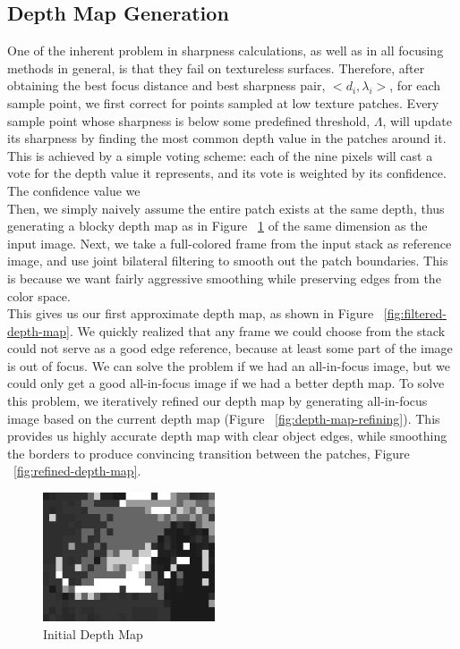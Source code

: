 \documentclass[annual, 12pt]{acmsiggraph}
\begin{document}
\subsection{Depth Map Generation}
\label{sec:depthmap-generation}
One of the inherent problem in sharpness calculations, as well as in all focusing methods in general, is that they fail on textureless surfaces.  Therefore, after obtaining the best focus distance and best sharpness pair, $<d_i, \lambda_i>$, for each sample point, we first correct for points sampled at low texture patches.  Every sample point whose sharpness is below some predefined threshold, $\Lambda$, will update its sharpness by finding the most common depth value in the patches around it.  This is achieved by a simple voting scheme: each of the nine pixels will cast a vote for the depth value it represents, and its vote is weighted by its confidence.  The confidence value we \\

Then, we simply naively assume the entire patch exists at the same depth, thus generating a blocky depth map as in Figure ~\ref{fig:initial-depth-map} of the same dimension as the input image. Next, we take a full-colored frame from the input stack as reference image, and use joint bilateral filtering to smooth out the patch boundaries.  This is because we want fairly aggressive smoothing while preserving edges from the color space. \\
This gives us our first approximate depth map, as shown in Figure ~\ref{fig:filtered-depth-map}.  We quickly realized that any frame we could choose from the stack could not serve as a good edge reference, because at least some part of the image is out of focus.  We can solve the problem if we had an all-in-focus image, but we could only get a good all-in-focus image if we had a better depth map.  To solve this problem, we iteratively refined our depth map by generating all-in-focus image based on the current depth map (Figure ~\ref{fig:depth-map-refining}).  This provides us highly accurate depth map with clear object edges, while smoothing the borders to produce convincing transition between the patches, Figure ~\ref{fig:refined-depth-map}.
\begin{figure}
\centering
\includegraphics[height=1.5in]{images/initial-depth-map.jpg}
\caption{Initial Depth Map}
\label{fig:initial-depth-map}
\end{figure}
\end{document}
